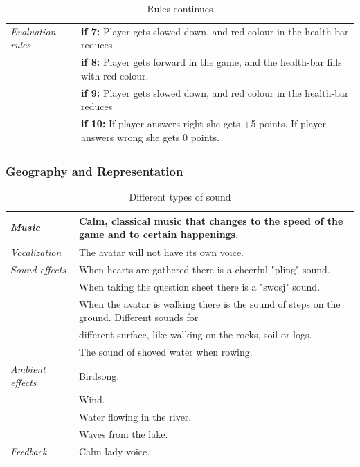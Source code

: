 \begin{table} [H]
\centering
\begin{tabular}{|p{}|p{}|}
\hline
\emph{Evaluation rules} & \textbf{if 7:} Player gets slowed down, and red colour in the health-bar reduces   \\ \cline{2-2}
& \textbf{if 8:} Player gets forward in the game, and the health-bar fills with red colour.   \\ \cline{2-2}
& \textbf{if 9:} Player gets slowed down, and red colour in the health-bar reduces   \\ \cline{2-2}
& \textbf{if 10:} If player answers right she gets +5 points. If player answers wrong she gets 0 points.  \\ \hline
\end{tabular}
\caption[Rules in the "Nature Trail" game]{Rules continues}
\label{tab:rules11}
\end{table}  

\subsubsection{Geography and Representation}

\begin{table} [H]
\centering
\begin{tabular}{|p{}|p{}|}
\hline
\emph{Music} & Calm, classical music that changes to the speed of the game and to certain happenings. \\ \hline
\emph{Vocalization} & The avatar will not have its own voice. \\ \hline
\emph{Sound effects} &  When hearts are gathered there is a cheerful "pling" sound.  \\ \cline{2-2}
&  When taking the question sheet there is a "swosj" sound.\\ \cline{2-2}
& When the avatar is walking there is the sound of steps on the ground. Different sounds for \\ & different surface, like walking on the rocks, soil or logs.\\ \cline{2-2}
& The sound of shoved water when rowing. \\ \hline
\emph{Ambient effects} & Birdsong. \\ \cline{2-2}
& Wind. \\ \cline{2-2}
& Water flowing in the river. \\ \cline{2-2}
& Waves from the lake.\\ \hline
\emph{Feedback} & Calm lady voice. \\ \hline
\end{tabular}
\caption[Different types of sound]{Different types of sound}
\label{tab:sound1}
\end{table}  

